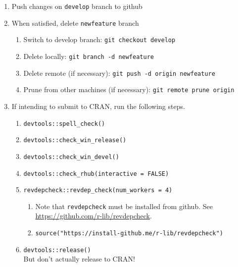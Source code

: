 \documentclass{article}
\begin{document}
\begin{enumerate}
  \item Push changes on \texttt{develop} branch to github
  \item When satisfied, delete \texttt{newfeature} branch
  \begin{enumerate}

    \item Switch to develop branch: \texttt{git checkout develop}

    \item Delete locally: \texttt{git branch -d newfeature}

    \item Delete remote (if necessary): \texttt{git push -d origin newfeature} 
	
	\item Prune from other machines (if necessary): \texttt{git remote prune origin} 

  \end{enumerate}
  
  \item If intending to submit to CRAN, 
        run the following steps.
  
  \begin{enumerate}
	  
    \item \verb+devtools::spell_check()+

	\item \verb+devtools::check_win_release()+

    \item \verb+devtools::check_win_devel()+

    \item \verb+devtools::check_rhub(interactive = FALSE)+
	
    \item \verb+revdepcheck::revdep_check(num_workers = 4)+
    \begin{enumerate}

      \item Note that \texttt{revdepcheck} must be installed from github. 
            See \url{https://github.com/r-lib/revdepcheck}.

      \item \texttt{source("https://install-github.me/r-lib/revdepcheck")}

    \end{enumerate}

    \item \verb+devtools::release()+ \\
          But don't actually release to CRAN!
            
  \end{enumerate}
\end{enumerate}
\end{document}
